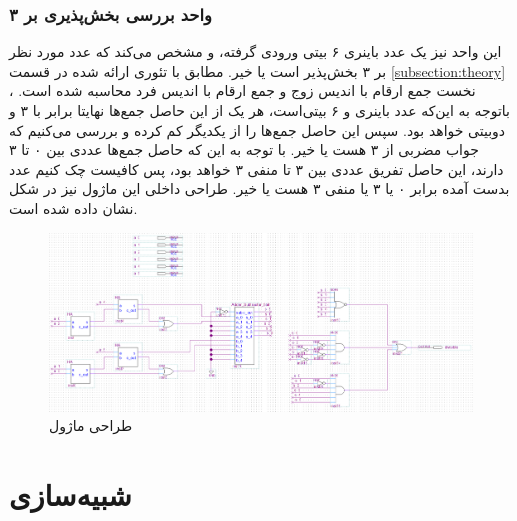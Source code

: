 \documentclass[12pt,onecolumn,a4paper,fleqn]{article}
\begin{document}
	\subsubsection{واحد بررسی بخش‌پذیری بر ۳}
	این واحد نیز یک عدد باینری ۶ بیتی ورودی گرفته، و مشخص می‌کند که عدد مورد نظر بر ۳ بخش‌پذیر است یا خیر. مطابق با تئوری ارائه شده در قسمت
	\ref{subsection:theory}
	، نخست جمع ارقام با اندیس زوج و جمع ارقام با اندیس فرد محاسبه شده است. باتوجه به این‌که عدد باینری و ۶ بیتی‌است، هر یک از این حاصل جمع‌ها نهایتا برابر با ۳ و دوبیتی خواهد بود. سپس این حاصل جمع‌ها را از یکدیگر کم کرده‌ و بررسی می‌کنیم که جواب مضربی از ۳ هست یا خیر. با توجه به این که حاصل جمع‌ها عددی بین ۰ تا ۳ دارند، این حاصل تفریق عددی بین ۳ تا منفی ۳ خواهد بود، پس کافیست چک کنیم عدد بدست آمده برابر ۰ یا ۳ یا منفی ۳ هست یا خیر. طراحی داخلی این ماژول نیز در شکل نشان داده شده است.
	\begin{figure}[H]
		\centering
		\includegraphics[scale=0.4]{source/isDiv3.png}
		\caption{طراحی ماژول }
		\label{div_11}
	\end{figure}
	\pagebreak
	\section{شبیه‌سازی}
	
\end{document}

